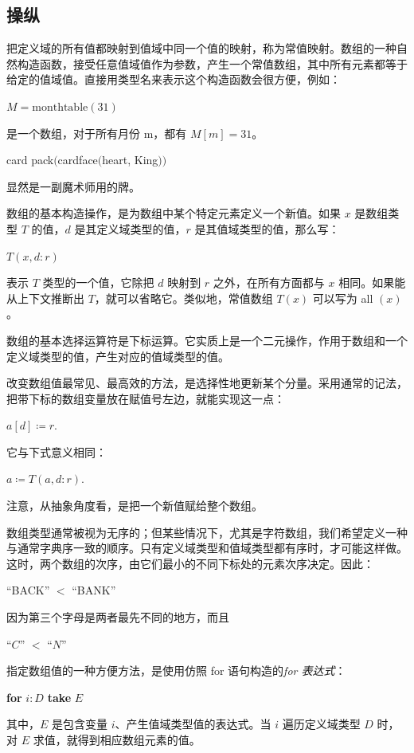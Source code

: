 \subsection{操纵}

把定义域的所有值都映射到值域中同一个值的映射，称为常值映射。数组的一种自然构造函数，接受任意值域值作为参数，产生一个常值数组，其中所有元素都等于给定的值域值。直接用类型名来表示这个构造函数会很方便，例如：

\quad $M = \text{monthtable}(31)$

\noindent
是一个数组，对于所有月份 m，都有 $M[m] = 31$。

\quad card pack$($cardface$($heart, King$))$

\noindent
显然是一副魔术师用的牌。

数组的基本构造操作，是为数组中某个特定元素定义一个新值。如果 $x$ 是数组类型 $T$ 的值，$d$ 是其定义域类型的值，$r$ 是其值域类型的值，那么写：

\quad $T(x, d:r)$

\noindent
表示 $T$ 类型的一个值，它除把 $d$ 映射到 $r$ 之外，在所有方面都与 $x$ 相同。如果能从上下文推断出 $T$，就可以省略它。类似地，常值数组 $T(x)$ 可以写为 all $(x)$。

数组的基本选择运算符是下标运算。它实质上是一个二元操作，作用于数组和一个定义域类型的值，产生对应的值域类型的值。

改变数组值最常见、最高效的方法，是选择性地更新某个分量。采用通常的记法，把带下标的数组变量放在赋值号左边，就能实现这一点：

\quad $a[d]\coloneq r.$

\noindent
它与下式意义相同：

\quad $a\coloneq T(a, d:r).$

\noindent
注意，从抽象角度看，是把一个新值赋给整个数组。

数组类型通常被视为无序的；但某些情况下，尤其是字符数组，我们希望定义一种与通常字典序一致的顺序。只有定义域类型和值域类型都有序时，才可能这样做。这时，两个数组的次序，由它们最小的不同下标处的元素次序决定。因此：

\quad ``BACK'' $<$ ``BANK''

\noindent
因为第三个字母是两者最先不同的地方，而且

\quad ``$C$'' $<$ ``$N$''

指定数组值的一种方便方法，是使用仿照 for 语句构造的\textit{for 表达式}：

\quad \textbf{for} $i:D$ \textbf{take} $E$

\noindent
其中，$E$ 是包含变量 $i$、产生值域类型值的表达式。当 $i$ 遍历定义域类型 $D$ 时，对 $E$ 求值，就得到相应数组元素的值。

